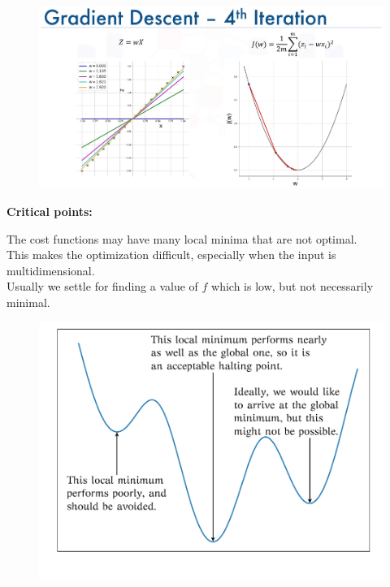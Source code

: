 \documentclass[10pt, compress]{beamer}
\begin{document}
\begin{frame}
  \begin{figure}
    \includegraphics[width=1\linewidth]{imgs/edx_dl_keras/gd10}
  \end{figure}
\end{frame}

\begin{frame}
  \textbf{Critical points:}
  \begin{multicols}{2}
    The cost functions may have many local minima that are not optimal. \\
    This makes the optimization difficult, especially when the input is multidimensional.\\
    Usually we settle for finding a value of $f$ which is low, but not necessarily minimal.

  \columnbreak

    \begin{figure}
      \includegraphics[width=1\linewidth]{imgs/minima.pdf}
    \end{figure}
  \end{multicols}
\end{frame}
\end{document}

